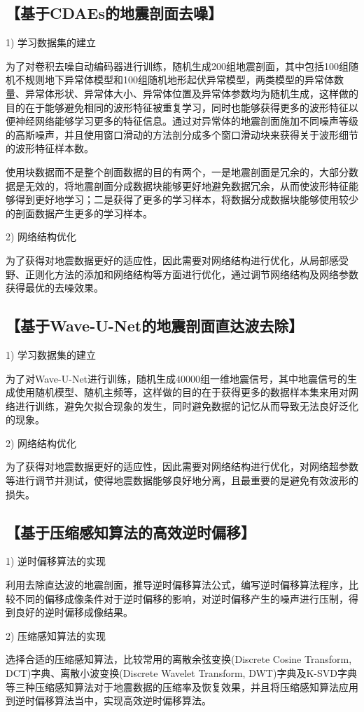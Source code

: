 \documentclass[11pt]{article}
\newcommand{\kai}{\CJKfamily{kai}}
\begin{document}
\subsection*{\kai\fontsize{11pt}{10pt} \selectfont【基于CDAEs的地震剖面去噪】}
1) 学习数据集的建立
\par
为了对卷积去噪自动编码器进行训练，随机生成200组地震剖面，其中包括100组随机不规则地下异常体模型和100组随机地形起伏异常模型，两类模型的异常体数量、异常体形状、异常体大小、异常体位置及异常体参数均为随机生成，这样做的目的在于能够避免相同的波形特征被重复学习，同时也能够获得更多的波形特征以便神经网络能够学习更多的特征信息。通过对异常体的地震剖面施加不同噪声等级的高斯噪声，并且使用窗口滑动的方法剖分成多个窗口滑动块来获得关于波形细节的波形特征样本数。
\par
使用块数据而不是整个剖面数据的目的有两个，一是地震剖面是冗余的，大部分数据是无效的，将地震剖面分成数据块能够更好地避免数据冗余，从而使波形特征能够得到更好地学习；二是获得了更多的学习样本，将数据分成数据块能够使用较少的剖面数据产生更多的学习样本。
\par
2) 网络结构优化
\par
为了获得对地震数据更好的适应性，因此需要对网络结构进行优化，从局部感受野、正则化方法的添加和网络结构等方面进行优化，通过调节网络结构及网络参数获得最优的去噪效果。

\subsection*{\kai\fontsize{11pt}{10pt} \selectfont【基于Wave-U-Net的地震剖面直达波去除】}
1) 学习数据集的建立
\par
为了对Wave-U-Net进行训练，随机生成40000组一维地震信号，其中地震信号的生成使用随机模型、随机主频等，这样做的目的在于获得更多的数据样本集来用对网络进行训练，避免欠拟合现象的发生，同时避免数据的记忆从而导致无法良好泛化的现象。
\par
2) 网络结构优化
\par
为了获得对地震数据更好的适应性，因此需要对网络结构进行优化，对网络超参数等进行调节并测试，使得地震数据能够良好地分离，且最重要的是避免有效波形的损失。

\subsection*{\kai\fontsize{11pt}{10pt} \selectfont【基于压缩感知算法的高效逆时偏移】}
1) 逆时偏移算法的实现
\par
利用去除直达波的地震剖面，推导逆时偏移算法公式，编写逆时偏移算法程序，比较不同的偏移成像条件对于逆时偏移的影响，对逆时偏移产生的噪声进行压制，得到良好的逆时偏移成像结果。
\par
2) 压缩感知算法的实现
\par
选择合适的压缩感知算法，比较常用的离散余弦变换(Discrete Cosine Transform, DCT)字典、离散小波变换(Discrete Wavelet Transform, DWT)字典及K-SVD字典等三种压缩感知算法对于地震数据的压缩率及恢复效果，并且将压缩感知算法应用到逆时偏移算法当中，实现高效逆时偏移算法。
\end{document}
